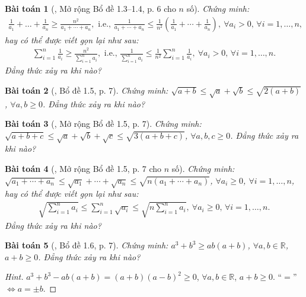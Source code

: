 \documentclass{article}
\newtheorem{baitoan}{Bài toán}
\begin{document}
\begin{baitoan}[\cite{Son_Nghiep_Trung_Can2021}, Mở rộng Bổ đề 1.3--1.4, p. 6 cho $n$ số]
	Chứng minh:
	\begin{align*}
		\frac{1}{a_1} + \ldots + \frac{1}{a_n}\ge\frac{n^2}{a_1 + \cdots + a_n},\mbox{ i.e., }\frac{1}{a_1 + \cdots + a_n}\le\frac{1}{n^2}\left(\frac{1}{a_1} + \cdots + \frac{1}{a_n}\right),\ \forall a_i > 0,\,\forall i = 1,\ldots,n,
	\end{align*}
	hay có thể được viết gọn lại như sau:
	\begin{align*}
		\sum_{i=1}^{n} \frac{1}{a_i}\ge\frac{n^2}{\sum_{i=1}^n a_i},\mbox{ i.e., }\frac{1}{\sum_{i=1}^n a_i}\le\frac{1}{n^2}\sum_{i=1}^n \frac{1}{a_i},\ \forall a_i > 0,\,\forall i = 1,\ldots,n.
	\end{align*}
	Đẳng thức xảy ra khi nào?
\end{baitoan}

\begin{baitoan}[\cite{Son_Nghiep_Trung_Can2021}, Bổ đề 1.5, p. 7]
	Chứng minh: $\sqrt{a + b}\le\sqrt{a} + \sqrt{b}\le\sqrt{2(a + b)}$, $\forall a,b\ge 0$. Đẳng thức xảy ra khi nào?
\end{baitoan}

\begin{baitoan}[\cite{Son_Nghiep_Trung_Can2021}, Mở rộng Bổ đề 1.5, p. 7]
	Chứng minh: $\sqrt{a + b + c}\le\sqrt{a} + \sqrt{b} + \sqrt{c}\le\sqrt{3(a + b + c)}$, $\forall a,b,c\ge 0$. Đẳng thức xảy ra khi nào?
\end{baitoan}

\begin{baitoan}[\cite{Son_Nghiep_Trung_Can2021}, Mở rộng Bổ đề 1.5, p. 7 cho $n$ số]
	Chứng minh: $\sqrt{a_1 + \cdots + a_n}\le\sqrt{a_1} + \cdots + \sqrt{a_n}\le\sqrt{n(a_1 + \cdots + a_n)}$, $\forall a_i\ge 0$, $\forall i = 1,\ldots,n$, hay có thể được viết gọn lại như sau:
	\begin{align*}
		\sqrt{\sum_{i=1}^n a_i}\le\sum_{i=1}^n \sqrt{a_i}\le\sqrt{n\sum_{i=1}^n a_i},\ \forall a_i\ge 0,\,\forall i = 1,\ldots,n.
	\end{align*}
	Đẳng thức xảy ra khi nào?
\end{baitoan}

\begin{baitoan}[\cite{Son_Nghiep_Trung_Can2021}, Bổ đề 1.6, p. 7]
	Chứng minh: $a^3 + b^3\ge ab(a + b)$, $\forall a,b\in\mathbb{R}$, $a + b\ge 0$. Đẳng thức xảy ra khi nào?
\end{baitoan}

\begin{proof}[Hint]
	$a^3 + b^3 - ab(a + b) = (a + b)(a - b)^2\ge 0$, $\forall a,b\in\mathbb{R}$, $a + b\ge 0$. ``$=$'' $\Leftrightarrow a = \pm b$.
\end{proof}
\end{document}
